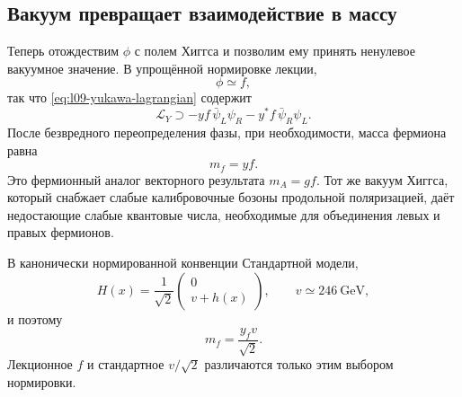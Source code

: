 \subsection{Вакуум превращает взаимодействие в массу}

Теперь отождествим \(\phi\) с полем Хиггса и позволим ему принять ненулевое вакуумное значение. В упрощённой нормировке лекции,
\begin{equation}
  \phi\simeq f,
\end{equation}
так что \eqref{eq:l09-yukawa-lagrangian} содержит
\begin{equation}
  \mathcal L_Y
  \supset
  -yf\,\bar\psi_L\psi_R
  -y^*f\,\bar\psi_R\psi_L .
\end{equation}
После безвредного переопределения фазы, при необходимости, масса фермиона равна
\begin{equation}
  m_f=yf.
  \label{eq:l09-lecture-fermion-mass}
\end{equation}
Это фермионный аналог векторного результата \(m_A=gf\). Тот же вакуум Хиггса, который снабжает слабые калибровочные бозоны продольной поляризацией, даёт недостающие слабые квантовые числа, необходимые для объединения левых и правых фермионов.

В канонически нормированной конвенции Стандартной модели,
\begin{equation}
  H(x)=\frac1{\sqrt2}
  \begin{pmatrix}
    0\\ v+h(x)
  \end{pmatrix},
  \qquad v\simeq246\ \mathrm{GeV},
  \label{eq:l09-sm-higgs-vacuum}
\end{equation}
и поэтому
\begin{equation}
  m_f=\frac{y_fv}{\sqrt2}.
  \label{eq:l09-sm-fermion-mass}
\end{equation}
Лекционное \(f\) и стандартное \(v/\sqrt2\) различаются только этим выбором нормировки.

\begin{classroomqa}
\end{classroomqa}

